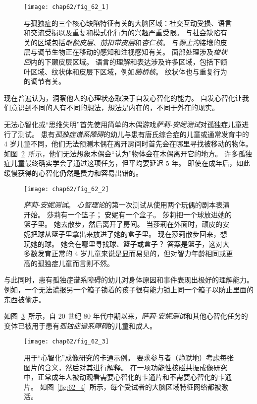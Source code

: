 \begin{figure}[htbp]
	\centering
	\texttt{[image: chap62/fig\_62\_1]}
	\caption{与孤独症的三个核心缺陷特征有关的大脑区域：社交互动受损、语言和交流受损以及重复和模式化行为的兴趣严重受限。
		与社会缺陷有关的区域包括\textit{眶额皮层}、\textit{前扣带皮层}和\textit{杏仁核}。
		与\textit{颞上沟}接壤的皮层与调节生物正在移动的感知和注视感知有关。
		面部处理涉及\textit{梭状回}内的下颞皮层区域。
		语言的理解和表达涉及许多区域，包括下额叶区域、纹状体和皮层下区域，例如\textit{脑桥核}。
		纹状体也与重复行为的调节有关。}
	\label{fig:62_1}
\end{figure}


现在普遍认为，洞察他人的心理状态取决于自发心智化的能力。
自发心智化让我们意识到不同的人有不同的想法，想法是内在的，不同于外在的现实。


无法心智化或“思维失明”首先使用简单的木偶游戏\textit{萨莉-安妮测试}对孤独症儿童进行了测试。
患有\textit{孤独症谱系障碍}的幼儿与患有唐氏综合症的儿童或通常发育中的 4 岁儿童不同，他们无法预测木偶在离开房间时首先会在哪里寻找被移动的物体。
如图~\ref{fig:62_2}~所示，他们无法想象木偶会“认为”物体会在木偶离开它的地方。
许多孤独症儿童最终确实学会了通过这项任务，但平均要延迟 5 年。
即使在成年后，如此缓慢获得的心智化仍然是费力和容易出错的。


\begin{figure}[htbp]
	\centering
	\texttt{[image: chap62/fig\_62\_2]}
	\caption{\textit{萨莉-安妮测试}。
		\textit{心智理论}的第一次测试从使用两个玩偶的剧本表演开始。
		莎莉有一个篮子；
		安妮有一个盒子。
		莎莉把一个球放进她的篮子里。
		她去散步，然后离开了房间。
		当莎莉在外面时，顽皮的安妮把球从篮子里拿出来放进了她的盒子里。
		现在莎莉散步回来，想玩她的球。
		她会在哪里寻找球、篮子或盒子？
		答案是篮子，这对大多数发育正常的 4 岁儿童来说是显而易见的，但对智力年龄相同或更高的孤独症儿童而言则不然。}
	\label{fig:62_2}
\end{figure}


与此同时，患有孤独症谱系障碍的幼儿对身体原因和事件表现出极好的理解能力。
例如，一个无法谎报另一个箱子锁着的孩子很有能力锁上同一个箱子以防止里面的东西被偷走。


如图~\ref{fig:62_3}~所示，自 20 世纪 80 年代中期以来，\textit{萨莉-安妮测试}和其他心智化任务的变体已被用于患有\textit{孤独症谱系障碍}的儿童和成人。


\begin{figure}[htbp]
	\centering
	\texttt{[image: chap62/fig\_62\_3]}
	\caption{用于“心智化”成像研究的卡通示例。
		要求参与者（静默地）考虑每张图片的含义，然后对其进行解释。
		在一项功能性核磁共振成像研究中，正常成年人被动观看需要心智化的卡通片和不需要心智化的卡通片。
		如图~\ref{fig:62_4}~所示，每个受试者的大脑区域特征网络都被激活\cite{gallagher2000reading}。}
	\label{fig:62_3}
\end{figure}



